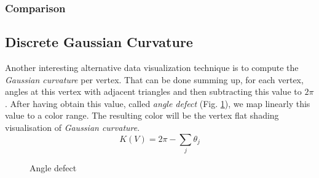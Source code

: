 \subsubsection{Comparison}
\color{red}{TODO: add armadillo, horse, etc. images with these 3 effects (flat shading 1 and 2, gouraud shading)}
\color{black} %

\subsection{Discrete Gaussian Curvature}
\label{section:vertex-area-gaussian-curvature}
Another interesting alternative data visualization technique is to compute the \textit{Gaussian curvature} per vertex. That can be done summing up, for each vertex, angles at this vertex with adjacent triangles and then subtracting this value to $2\pi$.
After having obtain this value, called \textit{angle defect} (Fig. \ref{fig:gc-angle}), we map linearly this value to a color range.
The resulting color will be the vertex flat shading visualisation of \textit{Gaussian curvature}.
$$K(V) = 2\pi - \sum_j \theta_j$$
\begin{figure}[!h]
    \centering
    \caption{Angle defect}\label{fig:gc-angle}
\end{figure}
